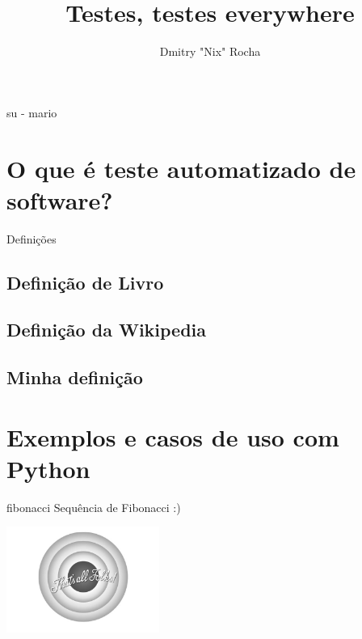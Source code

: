 \documentclass[]{beamer}
\author{Dmitry "Nix" Rocha}
\title{Testes, testes everywhere}
\institute{ /(guru|pug-)pi/i }
\begin{document}
  \begin{frame}[label=titlepage]
    \titlepage
  \end{frame}

  \begin{frame}{su - mario}
    \tableofcontents
  \end{frame}

  \section{O que é teste automatizado de software?}

  \begin{frame}
    \begin{center}
      \Huge Definições
    \end{center}
  \end{frame}

  \subsection*{Definição de Livro}\label{def1}
  

  \subsection*{Definição da Wikipedia}
  

  \subsection*{Minha definição}
  

  \backbgcolor
  \section{Exemplos e casos de uso com Python}

  \begin{frame}{fibonacci}
    Sequência de Fibonacci :)
  \end{frame}

  
  

  \begin{frame}{}
    \begin{center}
      \includegraphics[width=5cm]{images/isso-e-tudo}
    \end{center}
  \end{frame}
\end{document}
